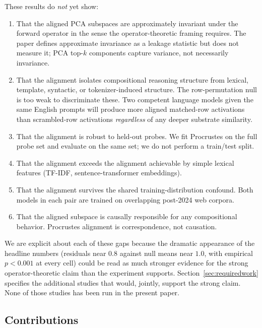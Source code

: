 These results do \emph{not} yet show:

\begin{enumerate}
    \item That the aligned PCA subspaces are approximately invariant
        under the forward operator in the sense the operator-theoretic
        framing requires. The paper defines approximate invariance as
        a leakage statistic but does not measure it; PCA top-$k$
        components capture variance, not necessarily invariance.
    \item That the alignment isolates compositional reasoning structure
        from lexical, template, syntactic, or tokenizer-induced
        structure. The row-permutation null is too weak to discriminate
        these. Two competent language models given the same English
        prompts will produce more aligned matched-row activations than
        scrambled-row activations \emph{regardless} of any deeper
        substrate similarity.
    \item That the alignment is robust to held-out probes. We fit
        Procrustes on the full probe set and evaluate on the same set;
        we do not perform a train/test split.
    \item That the alignment exceeds the alignment achievable by simple
        lexical features (TF-IDF, sentence-transformer embeddings).
    \item That the alignment survives the shared training-distribution
        confound. Both models in each pair are trained on overlapping
        post-2024 web corpora.
    \item That the aligned subspace is causally responsible for any
        compositional behavior. Procrustes alignment is correspondence,
        not causation.
\end{enumerate}

We are explicit about each of these gaps because the dramatic
appearance of the headline numbers (residuals near $0.8$ against null
means near $1.0$, with empirical $p < 0.001$ at every cell) could be
read as much stronger evidence for the strong operator-theoretic claim
than the experiment supports. Section~\ref{sec:requiredwork} specifies
the additional studies that would, jointly, support the strong claim.
None of those studies has been run in the present paper.

\subsection*{Contributions}

